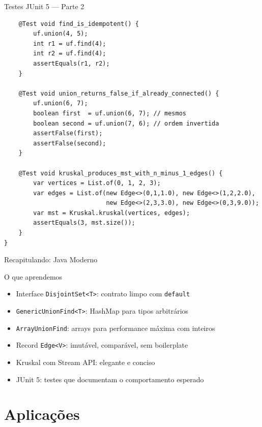 \documentclass[aspectratio=169]{beamer}
\begin{document}
\begin{frame}[fragile,shrink=25]{Testes JUnit 5 — Parte 2}%
\begin{lstlisting}
    @Test void find_is_idempotent() {
        uf.union(4, 5);
        int r1 = uf.find(4);
        int r2 = uf.find(4);
        assertEquals(r1, r2);
    }

    @Test void union_returns_false_if_already_connected() {
        uf.union(6, 7);
        boolean first  = uf.union(6, 7); // mesmos
        boolean second = uf.union(7, 6); // ordem invertida
        assertFalse(first);
        assertFalse(second);
    }

    @Test void kruskal_produces_mst_with_n_minus_1_edges() {
        var vertices = List.of(0, 1, 2, 3);
        var edges = List.of(new Edge<>(0,1,1.0), new Edge<>(1,2,2.0),
                            new Edge<>(2,3,3.0), new Edge<>(0,3,9.0));
        var mst = Kruskal.kruskal(vertices, edges);
        assertEquals(3, mst.size());
    }
}
\end{lstlisting}
\end{frame}

\begin{frame}{Recapitulando: Java Moderno}%
  \begin{block}{O que aprendemos}
    \begin{itemize}
      \item Interface \texttt{DisjointSet<T>}: contrato limpo com \texttt{default}
      \item \texttt{GenericUnionFind<T>}: HashMap para tipos arbitrários
      \item \texttt{ArrayUnionFind}: arrays para performance máxima com inteiros
      \item Record \texttt{Edge<V>}: imutável, comparável, sem boilerplate
      \item Kruskal com Stream API: elegante e conciso
      \item JUnit 5: testes que documentam o comportamento esperado
    \end{itemize}
  \end{block}
\end{frame}

\section{Aplicações}
\end{document}
